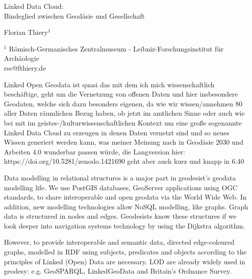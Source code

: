 \documentclass[a4paper]{article}
\begin{document}

\Large
 \begin{center}
Linked Data Cloud:\\Bindeglied zwischen Geod{\"a}sie und Gesellschaft\\ 

\hspace{10pt}

\large
Florian Thiery$^1$\\

\hspace{10pt}

\small  
$^1$ R{\"o}misch-Germanisches Zentralmuseum - Leibniz-Forschungsinstitut f{\"u}r Arch{\"a}ologie\\
rse@fthiery.de\\

\end{center}

\normalsize

Linked Open Geodata ist quasi das mit dem ich mich wissenschaftlich beschäftige, geht um die Vernetzung von offenen Daten und hier insbesondere Geodaten, welche sich dazu besonders eigenen, da wie wir wissen/annehmen 80 aller Daten räumlichen Bezug haben, ob jetzt im amtlichen Sinne oder auch wie bei mit im geistes-/kulturwissenschaftlichen Kontext um eine große sogenannte Linked Data Cloud zu erzeugen in denen Daten vernetzt sind und so neues Wissen generiert werden kann, was meiner Meinung nach in Geodäsie 2030 und Arbeiten 4.0 wunderbar passen würde, die Langversion hier: https://doi.org/10.5281/zenodo.1421690 geht aber auch kurz und knapp in 6.40

Data modelling in relational structures is a major part in geodesist's geodata modelling life. We use PostGIS databases, GeoServer applications using OGC standards, to share interoperable and open geodata via the World Wide Web. In addition, new modelling technologies allow NoSQL modelling, like graphs. Graph data is structured in nodes and edges. Geodesists know these structures if we look deeper into navigation systems technology by using the Dijkstra algorithm. 

However, to provide interoperable and semantic data, directed edge-coloured graphs, modelled in RDF using subjects, predicates and objects according to the principles of Linked (Open) Data\cite{tim_linked_2006} are necessary. LOD are already widely used in geodesy\cite{hart_linked_2013}: e.g. GeoSPARQL\cite{battle_geosparql_2011}, LinkedGeoData\cite{auer_linkedgeodata_2009} and Britain’s Ordnance Survey\cite{shadbolt_linked_2012}.
\end{document}

